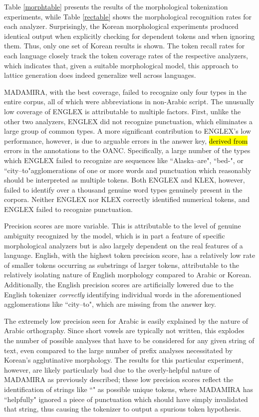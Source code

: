 Table \ref{morphtable} presents the results of the morphological tokenization experiments, while Table \ref{rectable} shows the morphological recognition rates for each analyzer. Surprisingly, the Korean morphological experiments produced identical output when explicitly checking for dependent tokens and when ignoring them. Thus, only one set of Korean results is shown. The token recall rates for each language closely track the token coverage rates of the respective analyzers, which indicates that, given a suitable morphological model, this approach to lattice generation does indeed generalize well across languages.

MADAMIRA, with the best coverage, failed to recognize only four types in the entire corpus, all of which were abbreviations in non-Arabic script. The unusually low coverage of ENGLEX is attributable to multiple factors. First, unlike the other two analyzers, ENGLEX did not recognize punctuation, which eliminates a large group of common types. A more significant contribution to ENGLEX's low performance, however, is due to arguable errors in the answer key, \hl{derived from} errors in the annotations to the OANC. Specifically, a large number of the types which ENGLEX failed to recognize are sequences like ``Alaska--are", ``bed-", or ``city--to"\textemdash agglomerations of one or more words and punctuation which reasonably should be interpreted as multiple tokens. Both ENGLEX and KLEX, however, failed to identify over a thousand genuine word types genuinely present in the corpora. Neither ENGLEX nor KLEX correctly identified numerical tokens, and ENGLEX failed to recognize punctuation.

Precision scores are more variable. This is attributable to the level of genuine ambiguity recognized by the model, which is in part a feature of specific morphological analyzers but is also largely dependent on the real features of a language. English, with the highest token precision score, has a relatively low rate of smaller tokens occurring as substrings of larger tokens, attributable to the relatively isolating nature of English morphology compared to Arabic or Korean.
Additionally, the English precision scores are artificially lowered due to the English tokenizer \textit{correctly} identifying individual words in the aforementioned agglomerations like ``city--to", which are missing from the answer key.

The extremely low precision seen for Arabic is easily explained by the nature of Arabic orthography. Since short vowels are typically not written, this explodes the number of possible analyses that have to be considered for any given string of text, even compared to the large number of prefix analyses necessitated by Korean's agglutinative morphology. The results for this particular experiment, however, are likely particularly bad due to the overly-helpful nature of MADAMIRA as previously described; these low precision scores reflect the identification of strings like \novocalize``" as possible unique tokens, where MADAMIRA has ``helpfully" ignored a piece of punctuation which should have simply invalidated that string, thus causing the tokenizer to output a spurious token hypothesis.

